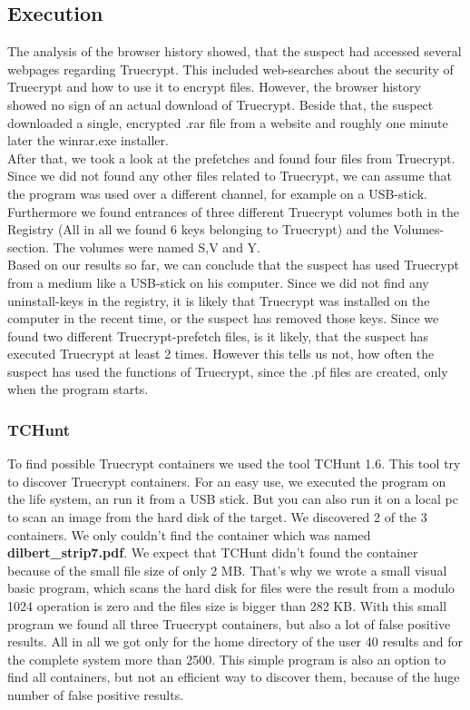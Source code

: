\subsection{Execution}
The analysis of the browser history showed, that the suspect had accessed several webpages regarding Truecrypt. This included web-searches about the security of Truecrypt and how to use it to encrypt files. However, the browser history showed no sign of an actual download of Truecrypt. Beside that, the suspect downloaded a single, encrypted .rar file from a website and roughly one minute later the winrar.exe installer.
\\
After that, we took a look at the prefetches and found four files from Truecrypt. Since we did not found any other files related to Truecrypt, we can assume that the program was used over a different channel, for example on a USB-stick. Furthermore we found entrances of three different Truecrypt volumes both in the Registry (All in all we found 6 keys belonging to Truecrypt) and the Volumes-section. The volumes were named S,V and Y.
\\
Based on our results so far, we can conclude that the suspect has used Truecrypt from a medium like a USB-stick on his computer. Since we did not find any uninstall-keys in the registry, it is likely that Truecrypt was installed on the computer in the recent time, or the suspect has removed those keys. Since we found two different Truecrypt-prefetch files, is it likely, that the suspect has executed Truecrypt at least 2 times. However this tells us not, how often the suspect has used the functions of Truecrypt, since the .pf files are created, only when the program starts.
\\
\subsubsection{TCHunt}
To find possible Truecrypt containers we used the tool TCHunt 1.6. This tool try to discover Truecrypt containers. For an easy use, we executed the program on the life system, an run it from a USB stick. But you can also run it on a local pc to scan an image from the hard disk of the target. We discovered 2 of the 3 containers. We only couldn't find the container which was named \textbf{dilbert\_strip7.pdf}. We expect that TCHunt didn't found the container because of the small file size of only 2 MB. That's why we wrote a small visual basic program, which scans the hard disk for files were the result from a modulo 1024 operation is zero and the files size is bigger than 282 KB. With this small program we found all three Truecrypt containers, but also a lot of false positive results. All in all we got only for the home directory of the user 40 results and for the complete system more than 2500. This simple program is also an option to find all containers, but not an efficient way to discover them, because of the huge number of false positive results.  
\\

